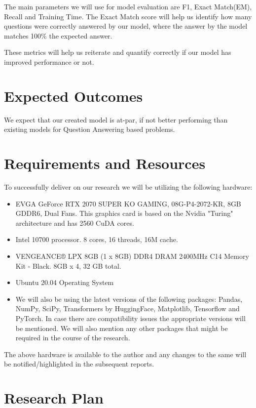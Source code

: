 \documentclass[11pt]{article}
\begin{document}
    The main parameters we will use for model evaluation are F1, Exact Match(EM), Recall and Training Time. The Exact Match score will help us identify how many questions were correctly answered by our model, where the answer by the model matches 100\% the expected answer.

    These metrics will help us reiterate and quantify correctly if our model has improved performance or not.

	\section{Expected Outcomes}\label{expectedoutcomes}

	We expect that our created model is at-par, if not better performing than existing models for Question Answering based problems.
	\section{Requirements and Resources}\label{resources}

	To successfully deliver on our research we will be utilizing the following hardware:
	\begin{itemize}
		\item EVGA GeForce RTX 2070 SUPER KO GAMING, 08G-P4-2072-KR, 8GB GDDR6, Dual Fans\citep{evga}. This graphics card is based on the Nvidia "Turing" architecture and has 2560 CuDA cores.
		\item Intel 10700 processor. 8 cores, 16 threads, 16M cache\citep{intel}.
		\item VENGEANCE® LPX 8GB (1 x 8GB) DDR4 DRAM 2400MHz C14 Memory Kit - Black\citep{Ram}. 8GB x 4, 32 GB total.
		\item Ubuntu 20.04 Operating System
		\item We will also be using the latest versions of the following packages: Pandas, NumPy, SciPy, Transformers by HuggingFace, Matplotlib, Tensorflow and PyTorch. In case there are compatibility issues the appropriate versions will be mentioned. We will also mention any other packages that might be required in the course of the research.
	\end{itemize}


	The above hardware is available to the author and any changes to the same will be notified/highlighted in the subsequent reports.
	\section{Research Plan}\label{plan}
\end{document}
